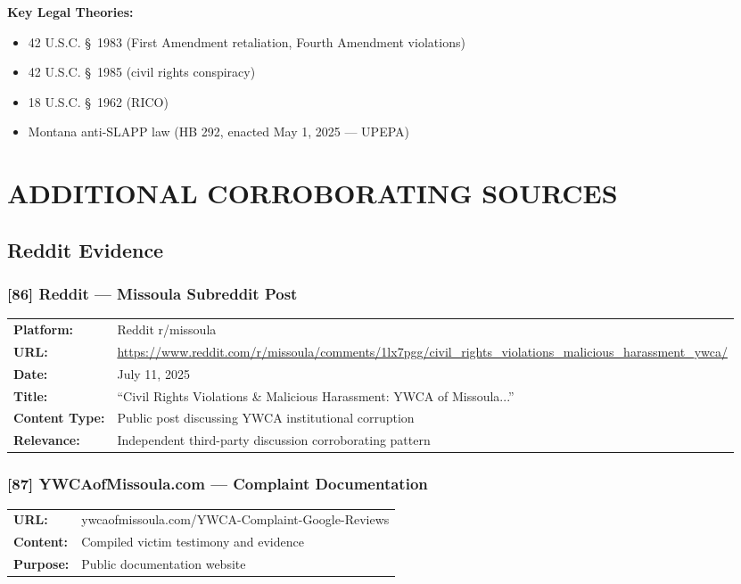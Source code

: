 \documentclass[11pt,letterpaper]{article}
\newcommand{\citeref}[1]{\textbf{\color{NavyBlue}[#1]}}
\begin{document}
\textbf{Key Legal Theories:}
\begin{itemize}[leftmargin=*]
\item 42 U.S.C. \S~1983 (First Amendment retaliation, Fourth Amendment violations)
\item 42 U.S.C. \S~1985 (civil rights conspiracy)
\item 18 U.S.C. \S~1962 (RICO)
\item Montana anti-SLAPP law (HB 292, enacted May 1, 2025 --- UPEPA)
\end{itemize}

\newpage

\section{ADDITIONAL CORROBORATING SOURCES}

\subsection{Reddit Evidence}

\subsubsection{\citeref{86} Reddit --- Missoula Subreddit Post}

\begin{tabular}{@{}p{1.4in}p{4.6in}@{}}
\textbf{Platform:} & Reddit r/missoula\\
\textbf{URL:} & \url{https://www.reddit.com/r/missoula/comments/1lx7pgg/civil_rights_violations_malicious_harassment_ywca/}\\
\textbf{Date:} & July 11, 2025\\
\textbf{Title:} & ``Civil Rights Violations \& Malicious Harassment: YWCA of Missoula...''\\
\textbf{Content Type:} & Public post discussing YWCA institutional corruption\\
\textbf{Relevance:} & Independent third-party discussion corroborating pattern\\
\end{tabular}

\subsubsection{\citeref{87} YWCAofMissoula.com --- Complaint Documentation}

\begin{tabular}{@{}p{1.4in}p{4.6in}@{}}
\textbf{URL:} & ywcaofmissoula.com/YWCA-Complaint-Google-Reviews\\
\textbf{Content:} & Compiled victim testimony and evidence\\
\textbf{Purpose:} & Public documentation website\\
\end{tabular}
\end{document}
